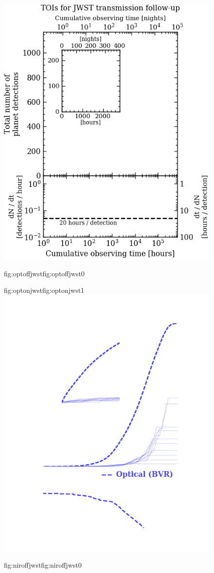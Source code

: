 \begin{figure}
  \centering
  \includegraphics[width=0.6\hsize]{figures/cumulativetobsGP_transmission_bkgd.png}%
  \hspace{-0.6\hsize}%
  \begin{ocg}{fig:optoffjwst}{fig:optoffjwst}{0}%
  \end{ocg}%
  \begin{ocg}{fig:optonjwst}{fig:optonjwst}{1}%
   \includegraphics[width=0.6\hsize]{figures/cumulativetobsGP_transmission_opt.png}%
  \end{ocg}
  \hspace{-0.6\hsize}%
  \begin{ocg}{fig:niroffjwst}{fig:niroffjwst}{0}%
  \end{ocg}%

\end{figure}
